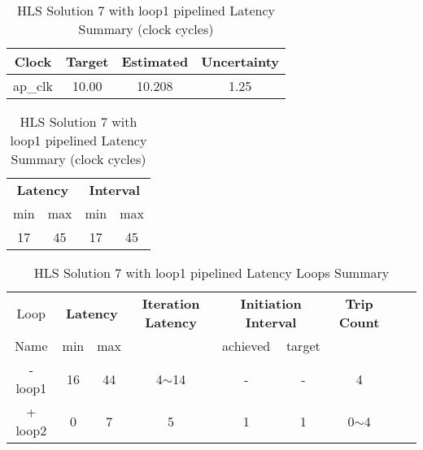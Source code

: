 

\begin{table}[H]
	\centering
	\begin{minipage}[t]{0.45\linewidth}
		\centering
		\begin{tabular}{|c|c|c|c|}
			\hline
			\textbf{Clock} & \textbf{Target} & \textbf{Estimated} & \textbf{Uncertainty} \\
			\hline
			ap\_clk & 10.00 & 10.208 & 1.25 \\
			\hline
		\end{tabular}
		\caption{HLS Solution 7 with loop1 pipelined Timing Summary (ns)}
		\label{tab:hls-solution-7-loop1-pipelined-timing-summary}
	\end{minipage}
	\hfill
	\begin{minipage}[t]{0.45\linewidth}
		\centering
		\begin{tabular}{|c|c|c|c|}
			\hline
			\multicolumn{2}{|c|}{\textbf{Latency}} & \multicolumn{2}{|c|}{\textbf{Interval}} \\
			min & max & min & max \\
			\hline
			17 & 45 & 17 & 45 \\
			\hline
		\end{tabular}
		\caption{HLS Solution 7 with loop1 pipelined Latency Summary (clock cycles)}
		\label{tab:hls-solution-7-loop1-pipeline-latency-summary}
	\end{minipage}
\end{table}

\begin{table}[H]
	\centering
	\begin{tabular}{|c|c|c|c|c|c|c|c|c|}
		\hline
		\multicolumn{1}{|c|}{Loop} & \multicolumn{2}{|c|}{\textbf{Latency}} & \multicolumn{1}{c|}{\textbf{Iteration Latency}} & \multicolumn{2}{c|}{\textbf{Initiation Interval}} & \multicolumn{1}{c|}{\textbf{Trip Count}}  \\
		Name & min & max &  & achieved & target &  \\
		\hline
		- loop1 & 16 & 44 & 4$\sim$14 & - & - & 4 \\
		+ loop2 & 0 & 7 & 5 & 1 & 1 & 0$\sim$4 \\
		\hline
	\end{tabular}
	\caption{HLS Solution 7 with loop1 pipelined Latency Loops Summary}
	\label{tab:hls-solution-7-loop1-pipeline-loop-summary}
\end{table}


